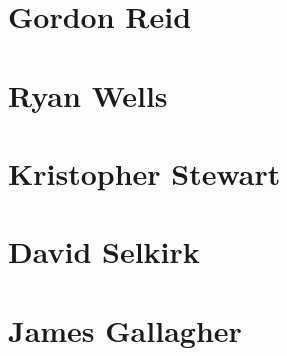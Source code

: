 \section{Gordon Reid}

\section{Ryan Wells}

\section{Kristopher Stewart}

\section{David Selkirk}

\section{James Gallagher}